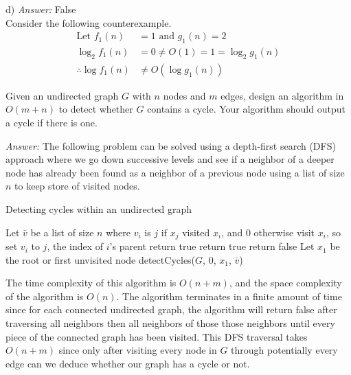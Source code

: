 \documentclass[12pt]{article}
\newenvironment{problem}[2][Problem]{\begin{trivlist}
\item[\hskip \labelsep {\bfseries #1}\hskip \labelsep {\bfseries #2.}]}{\end{trivlist}}
\begin{document}
d) \textit{Answer: } False\\
Consider the following counterexample.
\begin{align*}
\text{Let } f_1(n)&=1 \text{ and }g_1(n) = 2\\ 
\log_2 f_1(n)&= 0 \neq O(1) = 1 = \log_2 g_1(n)\\
\therefore \log f_1(n) &\neq O(\log g_1(n))
\end{align*}
\newpage
\begin{problem}{3}
Given an undirected graph $G$ with $n$ nodes and $m$ edges, design an algorithm in $O(m+n)$ to detect whether $G$ contains a cycle. Your algorithm should output a cycle if there is one. 
\end{problem}
\textit{Answer: }
The following problem can be solved using a depth-first search (DFS) approach where we go down successive levels and see if a neighbor of a deeper node has already been found as a neighbor of a previous node using a list of size $n$ to keep store of visited nodes.
\begin{algorithm}
\caption{Detecting cycles within an undirected graph}
\begin{algorithmic}
\State Let $\bar{v}$ be a list of size $n$ where $v_i$ is $j$ if $x_j$ visited $x_i$, and 0 otherwise
	\State visit $x_i$, so set $v_i$ to $j$, the index of $i$'s parent
				\State return true
			\EndIf
			\State return true
		\EndIf
	\EndFor
	\State return false
\EndProcedure
{}
	\State Let $x_1$ be the root or first unvisited node
	\State detectCycles($G$, 0, $x_1$, $\bar{v}$)
\EndWhile
\end{algorithmic}
\end{algorithm}

The time complexity of this algorithm is $O(n + m)$, and the space complexity of the algorithm is $O(n)$.
The algorithm terminates in a finite amount of time since for each connected undirected graph, the algorithm will return false after traversing all neighbors then all neighbors of those those neighbors until every piece of the connected graph has been visited. This DFS traversal takes $O(n+m)$ since only after visiting every node in $G$ through potentially every edge can we deduce whether our graph has a cycle or not.
\end{document}
